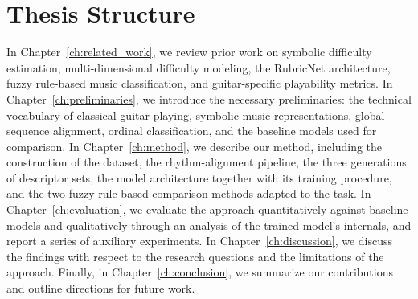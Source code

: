 \section{Thesis Structure}
In Chapter~\ref{ch:related_work}, we review prior work on symbolic difficulty estimation, multi-dimensional difficulty modeling, the RubricNet architecture, fuzzy rule-based music classification, and guitar-specific playability metrics. In Chapter~\ref{ch:preliminaries}, we introduce the necessary preliminaries: the technical vocabulary of classical guitar playing, symbolic music representations, global sequence alignment, ordinal classification, and the baseline models used for comparison. In Chapter~\ref{ch:method}, we describe our method, including the construction of the dataset, the rhythm-alignment pipeline, the three generations of descriptor sets, the model architecture together with its training procedure, and the two fuzzy rule-based comparison methods adapted to the task. In Chapter~\ref{ch:evaluation}, we evaluate the approach quantitatively against baseline models and qualitatively through an analysis of the trained model's internals, and report a series of auxiliary experiments. In Chapter~\ref{ch:discussion}, we discuss the findings with respect to the research questions and the limitations of the approach. Finally, in Chapter~\ref{ch:conclusion}, we summarize our contributions and outline directions for future work.

